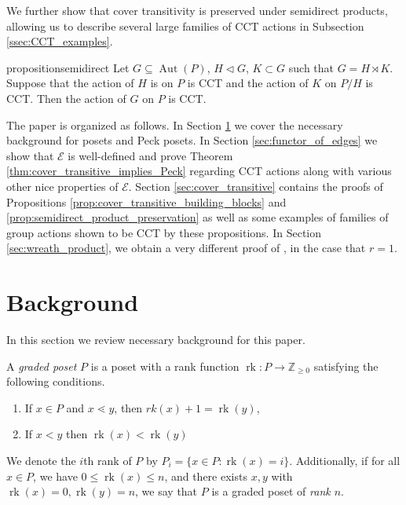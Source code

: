 \documentclass[smallextended]{svjour3}       %
\numberwithin{equation}{section}
\newcommand\rk{\operatorname{rk}}
\newcommand\Aut{\operatorname{Aut}}
\begin{document}
We further show that cover transitivity is preserved under semidirect products, allowing us to describe several large families of CCT actions in Subsection \ref{ssec:CCT_examples}.

\begin{restatable}{proposition}{semidirect}
\label{prop:semidirect_product_preservation}
Let $G\subseteq \Aut(P)$, $H\triangleleft G$, $K\subset G$ such that $G = H\rtimes K$.  Suppose that the action of $H$ is on $P$ is CCT and the action of $K$ on $P/H$ is CCT. Then the action of $G$ on $P$ is CCT.
\end{restatable}

The paper is organized as follows. In Section \ref{sec:background} we cover the necessary background for posets and Peck posets.  In Section \ref{sec:functor_of_edges} we show that $\mathcal E$ is well-defined and prove Theorem \ref{thm:cover_transitive_implies_Peck} regarding CCT actions along with various other nice properties of $\mathcal E$. Section \ref{sec:cover_transitive} contains the proofs of Propositions \ref{prop:cover_transitive_building_blocks} and \ref{prop:semidirect_product_preservation} as well as some examples of families of group actions shown to be CCT by these propositions. In Section \ref{sec:wreath_product}, we obtain a very different proof of \cite[Theorem 1.1]{pak}, in the case that $r = 1$.








\section{Background}\label{sec:background}
In this section we review necessary background for this paper. 

A {\it graded poset} $P$ is a poset with a rank function $\rk\colon P \rightarrow \mathbb Z_{\geq 0}$ satisfying the following conditions.
\begin{enumerate}
  \item If $x\in P$ and $x\lessdot y$, then $rk(x) + 1 = \rk(y)$,
  \item If $x < y$ then $\rk(x) < \rk(y)$ 
\end{enumerate}

We denote the $i$th rank of $P$ by  $P_i = \{x \in P\colon\rk(x) = i\}$. Additionally, if for all $x\in P$, we have $0 \leq \rk(x) \leq n$, and there exists $x,y$ with $\rk(x) = 0, \rk(y) = n$, we say that $P$ is a graded poset of {\it rank $n$}.
\end{document}
